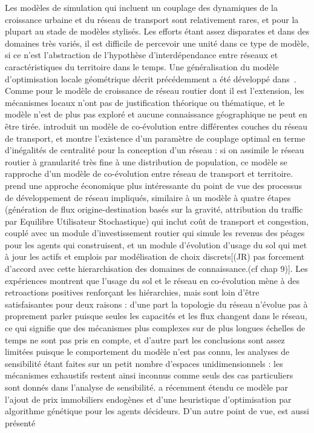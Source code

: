 {}{
Les modèles de simulation qui incluent un couplage des dynamiques de la croissance urbaine et du réseau de transport sont relativement rares, et pour la plupart au stade de modèles stylisés. Les efforts étant assez disparates et dans des domaines très variés, il est difficile de percevoir une unité dans ce type de modèle, si ce n'est l'abstraction de l'hypothèse d'interdépendance entre réseaux et caractéristiques du territoire dans le temps. Une généralisation du modèle d'optimisation locale géométrique décrit précédemment a été développé dans~\cite{barthelemy2009co}. Comme pour le modèle de croissance de réseau routier dont il est l'extension, les mécanismes locaux n'ont pas de justification théorique ou thématique, et le modèle n'est de plus pas exploré et aucune connaissance géographique ne peut en être tirée.  \cite{ding2017heuristic} introduit un modèle de co-évolution entre différentes couches du réseau de transport, et montre l'existence d'un paramètre de couplage optimal en terme d'inégalités de centralité pour la conception d'un réseau : si on assimile le réseau routier à granularité très fine à une distribution de population, ce modèle se rapproche d'un modèle de co-évolution entre réseau de transport et territoire. \cite{levinson2007co} prend une approche économique plus intéressante du point de vue des processus de développement de réseau impliqués, similaire à un modèle à quatre étapes (génération de flux origine-destination basés sur la gravité, attribution du traffic par Equilibre Utilisateur Stochastique) qui inclut coût de transport et congestion, couplé avec un module d'investissement routier qui simule les revenus des péages pour les agents qui construisent, et un module d'évolution d'usage du sol qui met à jour les actifs et emplois par modélisation de choix discrets[(JR) pas forcement d'accord avec cette hierarchisation des domaines de connaissance.(cf chap 9)]. Les expériences montrent que l'usage du sol et le réseau en co-évolution mène à des retroactions positives renforçant les hiérarchies, mais sont loin d'être satisfaisantes pour deux raisons : d'une part la topologie du réseau n'évolue pas à proprement parler puisque seules les capacités et les flux changent dans le réseau, ce qui signifie que des mécanismes plus complexes sur de plus longues échelles de temps ne sont pas pris en compte, et d'autre part les conclusions sont assez limitées puisque le comportement du modèle n'est pas connu, les analyses de sensibilité étant faites sur un petit nombre d'espaces unidimensionnels : les mécanismes exhaustifs restent ainsi inconnus comme seuls des cas particuliers sont donnés dans l'analyse de sensibilité. \cite{li2016integrated} a récemment étendu ce modèle par l'ajout de prix immobiliers endogènes et d'une heuristique d'optimisation par algorithme génétique pour les agents décideurs. D'un autre point de vue, \cite{levinson2005paving} est aussi présenté }
